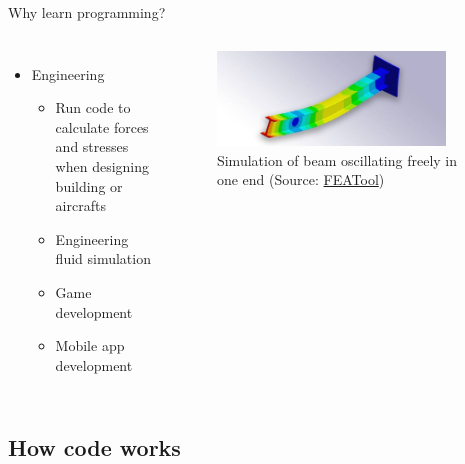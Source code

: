 \documentclass[10pt,xcolor={table,dvipsnames},t]{beamer}
\begin{document}
\begin{frame}{Why learn programming?}
  \begin{columns}
    \begin{itemize}
      \item Engineering
      \begin{itemize}
        \item Run code to calculate forces and stresses when designing building or aircrafts
        \item Engineering fluid simulation
        \item Game development
        \item Mobile app development
      \end{itemize}
    \end{itemize}

    \begin{figure}
      \includegraphics[width=0.9\textwidth]{img/euler-beam.jpg}
      \caption{Simulation of beam oscillating freely in one end (Source: \href{https://www.featool.com/tags/beam/}{FEATool})}
      \label{fig:euler_beam}
    \end{figure}
  \end{columns}
\end{frame}

\subsection{How code works}
\end{document}
